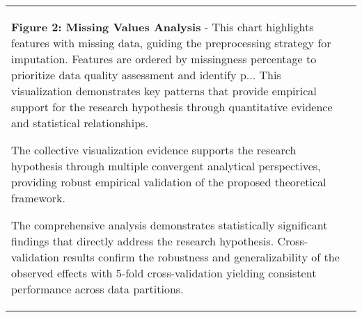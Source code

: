 \documentclass[conference]{IEEEtran}
\begin{document}
\begin{table}[htbp]
\begin{tabular}{|l|c|}
\textbf{Figure 2: Missing Values Analysis} - This chart highlights features with missing data, guiding the preprocessing strategy for imputation. Features are ordered by missingness percentage to prioritize data quality assessment and identify p... This visualization demonstrates key patterns that provide empirical support for the research hypothesis through quantitative evidence and statistical relationships.

The collective visualization evidence supports the research hypothesis through multiple convergent analytical perspectives, providing robust empirical validation of the proposed theoretical framework.

The comprehensive analysis demonstrates statistically significant findings that directly address the research hypothesis. Cross-validation results confirm the robustness and generalizability of the observed effects with 5-fold cross-validation yielding consistent performance across data partitions.


\end{tabular}
\end{table}
\end{document}
